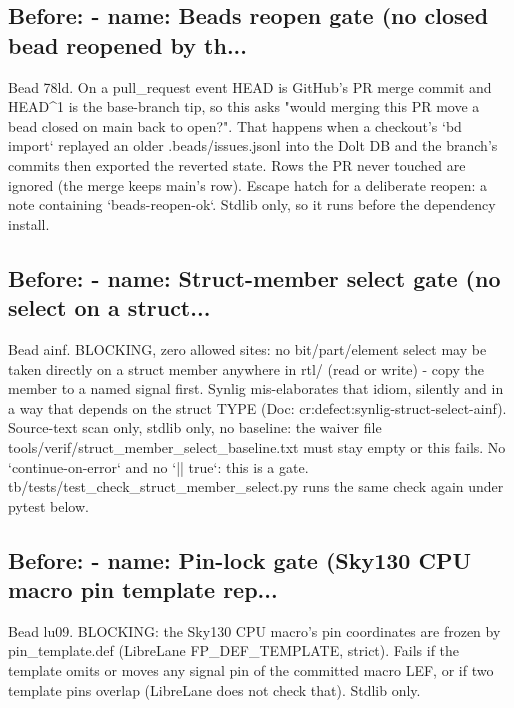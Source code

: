 \begin{record}

\subsection*{Before: - name: Beads reopen gate (no closed bead reopened by th...}

\begin{textblock}
Bead 78ld. On a pull_request event HEAD is GitHub's PR merge commit and
HEAD^1 is the base-branch tip, so this asks "would merging this PR move a
bead closed on main back to open?". That happens when a checkout's
`bd import` replayed an older .beads/issues.jsonl into the Dolt DB and the
branch's commits then exported the reverted state. Rows the PR never
touched are ignored (the merge keeps main's row). Escape hatch for a
deliberate reopen: a note containing `beads-reopen-ok`. Stdlib only, so
it runs before the dependency install.
\end{textblock}

\subsection*{Before: - name: Struct-member select gate (no select on a struct...}

\begin{textblock}
Bead ainf. BLOCKING, zero allowed sites: no bit/part/element select may be taken directly on
a struct member anywhere in rtl/ (read or write) - copy the member to a named signal first.
Synlig mis-elaborates that idiom, silently and in a way that depends on the struct TYPE
(Doc: cr:defect:synlig-struct-select-ainf). Source-text scan only, stdlib only, no baseline: the
waiver file tools/verif/struct_member_select_baseline.txt must stay empty or this fails.
No `continue-on-error` and no `|| true`: this is a gate. tb/tests/test_check_struct_member_select.py
runs the same check again under pytest below.
\end{textblock}

\subsection*{Before: - name: Pin-lock gate (Sky130 CPU macro pin template rep...}

\begin{textblock}
Bead lu09. BLOCKING: the Sky130 CPU macro's pin coordinates are frozen by pin_template.def
(LibreLane FP_DEF_TEMPLATE, strict). Fails if the template omits or moves any signal pin of the
committed macro LEF, or if two template pins overlap (LibreLane does not check that). Stdlib only.
\end{textblock}


\end{record}
